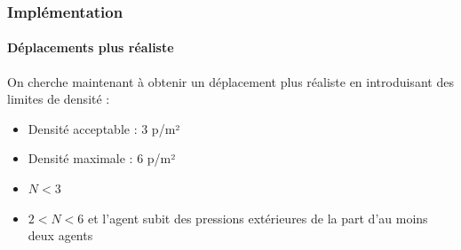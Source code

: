 \begin{frame}
    \frametitle{Implémentation}
    \framesubtitle{Déplacements plus réaliste}
    On cherche maintenant à obtenir un déplacement plus réaliste en introduisant des limites de densité : \\
    \begin{itemize}
        \item <2-> Densité acceptable : 3 p/m²
        \item <3-> Densité maximale : 6 p/m²
    \end{itemize}
    \bigskip
    \begin{itemize}
        \item <5-> $N<3$
        \item <6-> $2 <N< 6$ et l'agent subit des pressions extérieures de la part d'au moins deux agents
    \end{itemize}
\end{frame}


